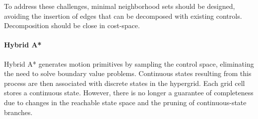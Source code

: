 To address these challenges, minimal neighborhood sets should be designed, avoiding the insertion of edges that can be decomposed with existing controls. 
Decomposition should be close in cost-space.

\paragraph*{Hybrid A*}
Hybrid A* generates motion primitives by sampling the control space, eliminating the need to solve boundary value problems. 
Continuous states resulting from this process are then associated with discrete states in the hypergrid. 
Each grid cell stores a continuous state.
However, there is no longer a guarantee of completeness due to changes in the reachable state space and the pruning of continuous-state branches.